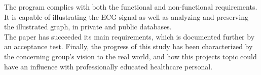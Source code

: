 The program complies with both the functional and non-functional requirements. It is capable of illustrating the ECG-signal as well as analyzing and preserving the illustrated graph, in private and public databases.\\
The paper has succeeded its main requirements, which is documented further by an acceptance test. Finally, the progress of this study has been characterized by the concerning group’s vision to the real world, and how this projects topic could have an influence with professionally educated healthcare personal.
